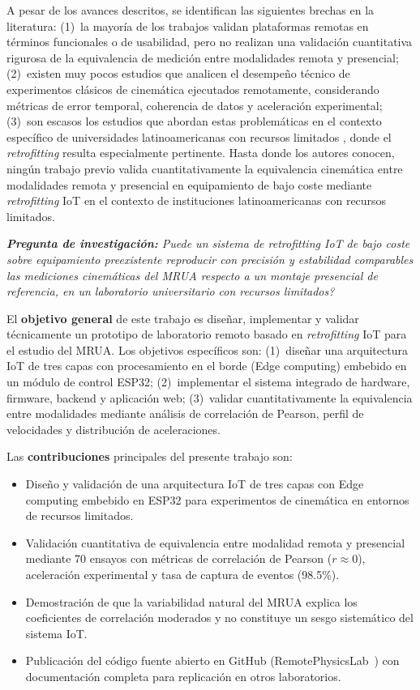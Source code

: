 \documentclass[journal,article,submit,pdftex]{Definitions/mdpi}
\begin{document}
A pesar de los avances descritos, se identifican las siguientes brechas en la literatura: (1)~la mayor\'ia de los trabajos validan plataformas remotas en t\'erminos funcionales o de usabilidad, pero no realizan una validaci\'on cuantitativa rigurosa de la equivalencia de medici\'on entre modalidades remota y presencial; (2)~existen muy pocos estudios que analicen el desempe\~no t\'ecnico de experimentos cl\'asicos de cinem\'atica ejecutados remotamente, considerando m\'etricas de error temporal, coherencia de datos y aceleraci\'on experimental; (3)~son escasos los estudios que abordan estas problem\'aticas en el contexto espec\'ifico de universidades latinoamericanas con recursos limitados \cite{r13,r14}, donde el \textit{retrofitting} resulta especialmente pertinente. Hasta donde los autores conocen, ning\'un trabajo previo valida cuantitativamente la equivalencia cinem\'atica entre modalidades remota y presencial en equipamiento de bajo coste mediante \textit{retrofitting} IoT en el contexto de instituciones latinoamericanas con recursos limitados.

\textit{\textbf{Pregunta de investigaci\'on:} \textrm{\textquestiondown}Puede un sistema de \textit{retrofitting} IoT de bajo coste sobre equipamiento preexistente reproducir con precisi\'on y estabilidad comparables las mediciones cinem\'aticas del MRUA respecto a un montaje presencial de referencia, en un laboratorio universitario con recursos limitados?}

El \textbf{objetivo general} de este trabajo es dise\~nar, implementar y validar t\'ecnicamente un prototipo de laboratorio remoto basado en \textit{retrofitting} IoT para el estudio del MRUA. Los objetivos espec\'ificos son: (1)~dise\~nar una arquitectura IoT de tres capas con procesamiento en el borde (Edge computing) embebido en un m\'odulo de control ESP32; (2)~implementar el sistema integrado de hardware, firmware, backend y aplicaci\'on web; (3)~validar cuantitativamente la equivalencia entre modalidades mediante an\'alisis de correlaci\'on de Pearson, perfil de velocidades y distribuci\'on de aceleraciones.

Las \textbf{contribuciones} principales del presente trabajo son:
\begin{itemize}
  \item Dise\~no y validaci\'on de una arquitectura IoT de tres capas con Edge computing embebido en ESP32 para experimentos de cinem\'atica en entornos de recursos limitados.
  \item Validaci\'on cuantitativa de equivalencia entre modalidad remota y presencial mediante 70 ensayos con m\'etricas de correlaci\'on de Pearson ($r \approx 0$), aceleraci\'on experimental y tasa de captura de eventos (98.5\%).
  \item Demostraci\'on de que la variabilidad natural del MRUA explica los coeficientes de correlaci\'on moderados y no constituye un sesgo sistem\'atico del sistema IoT.
  \item Publicaci\'on del c\'odigo fuente abierto en GitHub (RemotePhysicsLab~\cite{r15}) con documentaci\'on completa para replicaci\'on en otros laboratorios.
\end{itemize}
\end{document}
